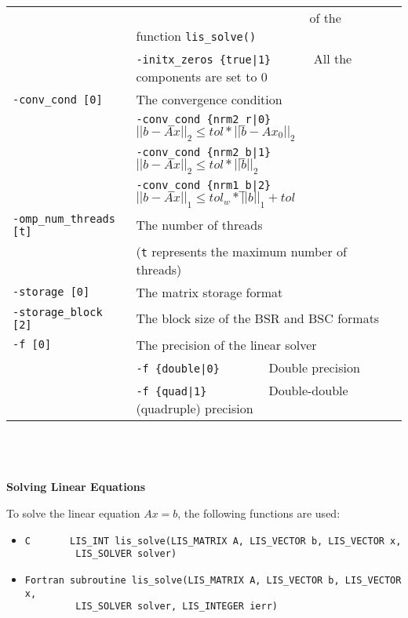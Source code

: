 \documentclass[a4paper]{article}
\begin{document}
\begin{minipage}[t]{\textwidth}
\begin{center}
\begin{tabular}{l|ll}
                       & \verb=                           =  of the function \verb=lis_solve()= \\
                       & \verb=-initx_zeros {true|1}      =  All the components are set to $0$ \\
\verb=-conv_cond [0]= & The convergence condition  \\
                       & \verb=-conv_cond {nrm2_r|0}     =  $||b-Ax||_2 \le tol * ||b-Ax_0||_2$ \\
                       & \verb=-conv_cond {nrm2_b|1}     =  $||b-Ax||_2 \le tol * ||b||_2$ \\
                       & \verb=-conv_cond {nrm1_b|2}     =  $||b-Ax||_1 \le tol_w * ||b||_1 + tol$\\
\verb=-omp_num_threads [t]= & The number of threads        \\ 
                            & (\verb=t= represents the maximum number of
 threads) \\
\verb=-storage [0]=    & The matrix storage format \\
\verb=-storage_block [2]=& The block size of the BSR and BSC formats\\ 
\verb=-f [0]=          & The precision of the linear solver\\
                       & \verb=-f {double|0}       =  Double precision \\ 
                       & \verb=-f {quad|1}         =  Double-double (quadruple) precision \\
\hline         
\end{tabular}
\end{center}
\end{minipage}
\\ \\ \\
\noindent
{\bf Solving Linear Equations}

To solve the linear equation $Ax = b$, the following functions are used:
\begin{itemize}
\item \verb|C       LIS_INT lis_solve(LIS_MATRIX A, LIS_VECTOR b, LIS_VECTOR x,|\\
      \verb|         LIS_SOLVER solver)|
\item \verb|Fortran subroutine lis_solve(LIS_MATRIX A, LIS_VECTOR b, LIS_VECTOR x,|\\
      \verb|         LIS_SOLVER solver, LIS_INTEGER ierr)|
\end{itemize}
\end{document}

